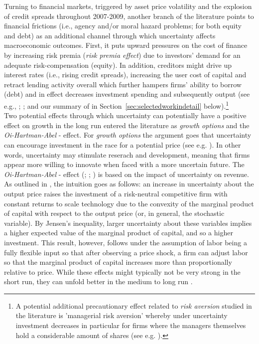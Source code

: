 \documentclass[a4paper,11pt,listof=nochaptergap,oneside,pointednumbers,bibtotoc,bigheadings,liststotoc,hidelinks]{scrbook}
\theoremstyle{mysatz}
\theoremstyle{mydefinition}
\theoremstyle{mytheorem}
\theoremstyle{mybemerkung}
\begin{document}
Turning to financial markets, triggered by asset price volatility and the explosion of credit spreads throughout 2007-2009, another branch of the literature points to financial frictions (i.e., agency and/or moral hazard problems; for both equity and debt) as an additional channel through which uncertainty affects macroeconomic outcomes. First, it puts upward pressures on the cost of finance by increasing risk premia (\textit{risk premia effect}) due to investors' demand for an adequate risk-compensation (equity). In addition, creditors might drive up interest rates (i.e., rising credit spreads), increasing the user cost of capital and retract lending activity overall which further hampers firms' ability to borrow (debt) and in effect decreases investment spending and subsequently output (see e.g., \citealp{christianoetal:14}; \citealp{arenalloetal:11}; \citealp{arellanoetal:16} and our summary of \citet{gilchristetal:14} in Section~\ref{sec:selectedworkindetail} below).\footnote{A potential additional precautionary effect related to \textit{risk aversion} studied in the literature is 'managerial risk aversion' whereby under uncertainty investment decreases in particular for firms where the managers themselves hold a considerable amount of shares (see e.g. \citealp{panousiandpananikolaou:12}).}\\

Two potential effects through which uncertainty can potentially have a positive effect on growth in the long run entered the literature as \textit{growth options} and the \textit{Oi-Hartman-Abel} - effect. For \textit{growth options} the argument goes that uncertainty can encourage investment in the race for a potential price (see e.g. \citealp{ilhanstrange:96}). In other words, uncertainty may stimulate reserach and development, meaning that firms appear more willing to innovate when faced with a more uncertain future. The \textit{Oi-Hartman-Abel} - effect (\citealp{oi:61}; \citealp{hartman:72}; \citealp{abel:83}) is based on the impact of uncertainty on revenue. As outlined in \citet{saltarietal:00}, the intuition goes as follows: an increase in uncertainty about the output price raises the investment of a risk-neutral competitive firm with constant returns to scale technology due to the convexity of the marginal product of capital with respect to the output price (or, in general, the stochastic variable). By Jensen’s inequality, larger uncertainty about these variables implies a higher expected value of the marginal product of capital, and so a higher investment. This result, however, follows under the assumption of labor being a fully flexible input so that after observing a price shock, a firm can adjust labor so that the marginal product of capital increases more than proportionally relative to price. While these effects might typically not be very strong in the short run, they can unfold better in the medium to long run \citep{bloom:14}.\\
\end{document}
